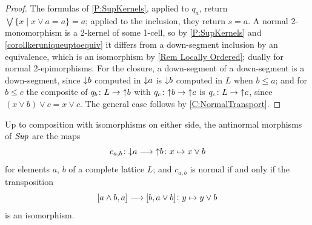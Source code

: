 \begin{proof}
  \leanok
  The formulas of \prox\ref{P:SupKernels}, applied to \(q_{a}\), return \(\bigvee\{x\mid x\vee a=a\}=a\); applied to the inclusion, they return \(s=a\). A normal 2-monomorphism is a 2-kernel of some 1-cell, so by \prox\ref{P:SupKernels} and \corx\ref{corollkeruniqueuptoequiv} it differs from a down-segment inclusion by an equivalence, which is an isomorphism by \remx\ref{Rem Locally Ordered}; dually for normal 2-epimorphisms. For the closure, a down-segment of a down-segment is a down-segment, since \({\downarrow}b\) computed in \({\downarrow}a\) is \({\downarrow}b\) computed in \(L\) when \(b\leq a\); and for \(b\leq c\) the composite of \(q_{b}\colon L\to{\uparrow}b\) with \(q_{c}\colon{\uparrow}b\to{\uparrow}c\) is \(q_{c}\colon L\to{\uparrow}c\), since \((x\vee b)\vee c=x\vee c\). The general case follows by \corx\ref{C:NormalTransport}.
\end{proof}

\begin{proposition}
  \label{P:SupAntinormal}   \leanok
  Up to composition with isomorphisms on either side, the antinormal morphisms of \(\mathit{Sup}\) are the maps
	\[
		c_{a,b}\colon{\downarrow}a\longrightarrow{\uparrow}b\colon x\mapsto x\vee b
	\]
	for elements \(a\), \(b\) of a complete lattice \(L\); and \(c_{a,b}\) is normal if and only if the transposition
	\[
		[a\wedge b,a]\longrightarrow[b,a\vee b]\colon y\mapsto y\vee b
	\]
	is an isomorphism.
\end{proposition}

